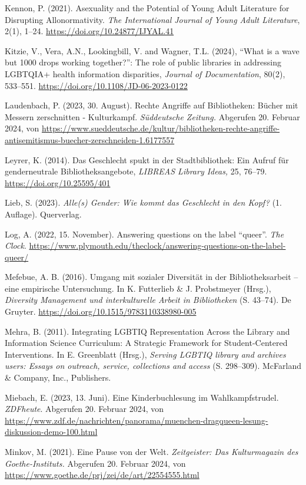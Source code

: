 \documentclass[a4paper,
fontsize=11pt,
oneside,
numbers=noperiodatend,
parskip=half-,
bibliography=totoc,
final
]{scrartcl}
\begin{document}
Kennon, P. (2021). Asexuality and the Potential of Young Adult
Literature for Disrupting Allonormativity. \emph{The International
Journal of Young Adult Literature}, 2(1), 1--24.
\url{https://doi.org/10.24877/IJYAL.41}

Kitzie, V., Vera, A.N., Lookingbill, V. and Wagner, T.L. (2024),
\enquote{What is a wave but 1000 drops working together?}: The role of
public libraries in addressing LGBTQIA+ health information disparities,
\emph{Journal of Documentation}, 80(2), 533--551.
\url{https://doi.org/10.1108/JD-06-2023-0122}

Laudenbach, P. (2023, 30. August). Rechte Angriffe auf Bibliotheken:
Bücher mit Messern zerschnitten - Kulturkampf. \emph{Süddeutsche
Zeitung.} Abgerufen 20. Februar 2024, von
\url{https://www.sueddeutsche.de/kultur/bibliotheken-rechte-angriffe-antisemitismus-buecher-zerschneiden-1.6177557}

Leyrer, K. (2014). Das Geschlecht spukt in der Stadtbibliothek: Ein
Aufruf für genderneutrale Bibliotheksangebote, \emph{LIBREAS Library
Ideas,} 25, 76--79. \url{https://doi.org/10.25595/401}

Lieb, S. (2023). \emph{Alle(s) Gender: Wie kommt das Geschlecht in den
Kopf?} (1. Auflage). Querverlag.

Log, A. (2022, 15. November). Answering questions on the label
\enquote{queer}. \emph{The Clock}.
\url{https://www.plymouth.edu/theclock/answering-questions-on-the-label-queer/}

Mefebue, A. B. (2016). Umgang mit sozialer Diversität in der
Bibliotheksarbeit -- eine empirische Untersuchung. In K. Futterlieb \&
J. Probstmeyer (Hrsg.), \emph{Diversity Management und interkulturelle
Arbeit in Bibliotheken} (S. 43--74). De Gruyter.
\url{https://doi.org/10.1515/9783110338980-005}

Mehra, B. (2011). Integrating LGBTIQ Representation Across the Library
and Information Science Curriculum: A Strategic Framework for
Student-Centered Interventions. In E. Greenblatt (Hrsg.), \emph{Serving
LGBTIQ library and archives users: Essays on outreach, service,
collections and access} (S. 298--309). McFarland \& Company, Inc.,
Publishers.

Miebach, E. (2023, 13. Juni). Eine Kinderbuchlesung im Wahlkampfstrudel.
\emph{ZDFheute}. Abgerufen 20. Februar 2024, von
\url{https://www.zdf.de/nachrichten/panorama/muenchen-dragqueen-lesung-diskussion-demo-100.html}

Minkov, M. (2021). Eine Pause von der Welt. \emph{Zeitgeister: Das
Kulturmagazin des Goethe-Instituts.} Abgerufen 20. Februar 2024, von
\url{https://www.goethe.de/prj/zei/de/art/22554555.html}
\end{document}
